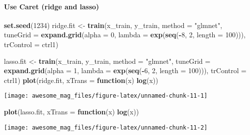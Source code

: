 \documentclass[]{article}
\newenvironment{Shaded}{\begin{snugshade}}{\end{snugshade}}
\newcommand{\KeywordTok}[1]{\textcolor[rgb]{0.13,0.29,0.53}{\textbf{#1}}}
\newcommand{\DataTypeTok}[1]{\textcolor[rgb]{0.13,0.29,0.53}{#1}}
\newcommand{\DecValTok}[1]{\textcolor[rgb]{0.00,0.00,0.81}{#1}}
\newcommand{\StringTok}[1]{\textcolor[rgb]{0.31,0.60,0.02}{#1}}
\newcommand{\ControlFlowTok}[1]{\textcolor[rgb]{0.13,0.29,0.53}{\textbf{#1}}}
\newcommand{\OperatorTok}[1]{\textcolor[rgb]{0.81,0.36,0.00}{\textbf{#1}}}
\newcommand{\NormalTok}[1]{#1}
\let\oldparagraph\paragraph
\renewcommand{\paragraph}[1]{\oldparagraph{#1}\mbox{}}
\begin{document}
\paragraph{Use Caret (ridge and lasso)}\label{use-caret-ridge-and-lasso}

\begin{Shaded}
\begin{Highlighting}[]
\KeywordTok{set.seed}\NormalTok{(}\DecValTok{1234}\NormalTok{)}
\NormalTok{ridge.fit <-}\StringTok{ }\KeywordTok{train}\NormalTok{(x_train, y_train, }\DataTypeTok{method =} \StringTok{"glmnet"}\NormalTok{, }
                   \DataTypeTok{tuneGrid =} \KeywordTok{expand.grid}\NormalTok{(}\DataTypeTok{alpha =} \DecValTok{0}\NormalTok{,}
                                          \DataTypeTok{lambda =} \KeywordTok{exp}\NormalTok{(}\KeywordTok{seq}\NormalTok{(}\OperatorTok{-}\DecValTok{8}\NormalTok{, }\DecValTok{2}\NormalTok{, }\DataTypeTok{length =} \DecValTok{100}\NormalTok{))),}
                   \DataTypeTok{trControl =}\NormalTok{ ctrl1)}

\NormalTok{lasso.fit <-}\StringTok{ }\KeywordTok{train}\NormalTok{(x_train, y_train, }\DataTypeTok{method =} \StringTok{"glmnet"}\NormalTok{, }
                   \DataTypeTok{tuneGrid =} \KeywordTok{expand.grid}\NormalTok{(}\DataTypeTok{alpha =} \DecValTok{1}\NormalTok{,}
                                          \DataTypeTok{lambda =} \KeywordTok{exp}\NormalTok{(}\KeywordTok{seq}\NormalTok{(}\OperatorTok{-}\DecValTok{6}\NormalTok{, }\DecValTok{2}\NormalTok{, }\DataTypeTok{length =} \DecValTok{100}\NormalTok{))),}
                   \DataTypeTok{trControl =}\NormalTok{ ctrl1)}
\KeywordTok{plot}\NormalTok{(ridge.fit, }\DataTypeTok{xTrans =} \ControlFlowTok{function}\NormalTok{(x) }\KeywordTok{log}\NormalTok{(x))}
\end{Highlighting}
\end{Shaded}

\texttt{[image: awesome\_mag\_files/figure-latex/unnamed-chunk-11-1]}

\begin{Shaded}
\begin{Highlighting}[]
\KeywordTok{plot}\NormalTok{(lasso.fit, }\DataTypeTok{xTrans =} \ControlFlowTok{function}\NormalTok{(x) }\KeywordTok{log}\NormalTok{(x))}
\end{Highlighting}
\end{Shaded}

\texttt{[image: awesome\_mag\_files/figure-latex/unnamed-chunk-11-2]}
\end{document}
